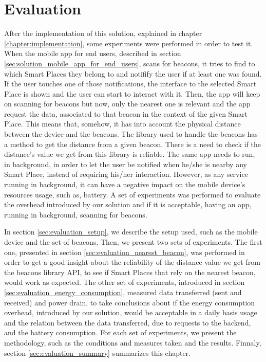 
\chapter{Evaluation}
\label{chapter:evaluation}

After the implementation of this solution, explained in chapter \ref{chapter:implementation}, some experiments were performed in order to test it.
When the mobile app for end users,
described in section \ref{sec:solution_mobile_app_for_end_users}, scans for beacons, it tries to find to which Smart Places they belong to and notifify the user if at least one was found.
If the user touches one of those notifications, the interface to the selected Smart Place is shown and the user can start to interact with it.
Then, the app will keep on scanning for beacons but now, only the nearest one is relevant and the app request the data, associated to that beacon in the context of the given Smart Place.
This means that, somehow, it has into account the physical distance between the device and the beacons.
The library used to handle the beacons has a method to get the distance from a given beacon.
There is a need to check if the distance's value we get from this library is reliable.
The same app needs to run, in background, in order to let the user be notified when he/she is nearby any Smart Place, instead of requiring his/her interaction.
However, as any service running in background, it can have a negative impact on the mobile device's resources usage, such as, battery.
A set of experiments was performed to evaluate the overhead introduced by our solution and if it is acceptable, having an app, running in background, scanning for beacons.

In section \ref{sec:evaluation_setup}, we describe the setup used, such as the mobile device and the set of beacons.
Then, we present two sets of experiments.
The first one, presented in section \ref{sec:evaluation_nearest_beacon}, was performed in order to get a good insight about the reliability of the distance value we get from the beacons library \gls{API}, to see if Smart Places that rely on the nearest beacon, would work as expected.
The other set of experiments, introduced in section \ref{sec:evaluation_energy_consumption}, measured data transferred (sent and received) and power drain, to take conclusions about if the energy consumption overhead, introduced by our solution, would be acceptable in a daily basis usage and the relation between the data transferred, due to requests to the backend, and the battery consumption.
For each set of experiments, we present the methodology, such as the conditions and measures taken and the results.
Finnaly, section \ref{sec:evaluation_summary} summarizes this chapter.

